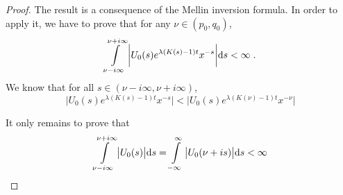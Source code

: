 \documentclass[11pt]{amsart}
\begin{document}
    \begin{proof}
    The result is a consequence of the Mellin inversion formula.
    In order to apply it, we have to prove that for any $\nu \in (p_0, q_0)$, 
        \begin{equation*}
            \int\limits_{\nu - i \infty}^{\nu + i \infty} \bigg| U_0(s) e^{\lambda(K(s) - 1) t} x^{-s} \bigg| \mathrm ds < \infty
            \; .
        \end{equation*}
    We know that for all $s \in (\nu - i\infty, \nu + i\infty)$, 
        \begin{equation*}
             \bigg| U_0(s) e^{\lambda(K(s) - 1) t} x^{-s} \bigg|  <   \bigg| U_0(s)  e^{\lambda(K(\nu) - 1) t}  x^{-\nu} \bigg|
        \end{equation*}
    
    It only remains to prove that 
        \begin{equation}
                \int\limits_{\nu - i \infty}^{\nu + i \infty} \big| U_0(s)\big| \mathrm ds 
                = 
                \int\limits_{-\infty}^{\infty} \big| U_0(\nu + is)\big| \mathrm ds
                < \infty
                \label{eq:DouEsc43}
        \end{equation}
    

\end{proof}
\end{document}

